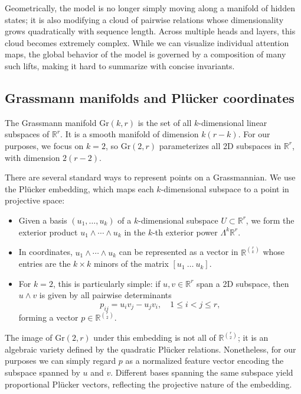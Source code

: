 \documentclass[11pt]{article}
\newcommand{\Gr}{\mathrm{Gr}}
\begin{document}
Geometrically, the model is no longer simply moving along a manifold of hidden states; it is also modifying a cloud of pairwise relations whose dimensionality grows quadratically with sequence length. Across multiple heads and layers, this cloud becomes extremely complex. While we can visualize individual attention maps, the global behavior of the model is governed by a composition of many such lifts, making it hard to summarize with concise invariants.

\subsection{Grassmann manifolds and Pl\"ucker coordinates}

The Grassmann manifold $\Gr(k, r)$ is the set of all $k$-dimensional linear subspaces of $\mathbb{R}^r$. It is a smooth manifold of dimension $k(r - k)$. For our purposes, we focus on $k=2$, so $\Gr(2, r)$ parameterizes all 2D subspaces in $\mathbb{R}^r$, with dimension $2(r-2)$.

There are several standard ways to represent points on a Grassmannian. We use the Pl\"ucker embedding, which maps each $k$-dimensional subspace to a point in projective space:

\begin{itemize}
    \item Given a basis $(u_1, \dots, u_k)$ of a $k$-dimensional subspace $U \subset \mathbb{R}^r$, we form the exterior product $u_1 \wedge \cdots \wedge u_k$ in the $k$-th exterior power $\Lambda^k \mathbb{R}^r$.
    \item In coordinates, $u_1 \wedge \cdots \wedge u_k$ can be represented as a vector in $\mathbb{R}^{\binom{r}{k}}$ whose entries are the $k \times k$ minors of the matrix $[u_1 \ \dots \ u_k]$.
    \item For $k=2$, this is particularly simple: if $u, v \in \mathbb{R}^r$ span a 2D subspace, then $u \wedge v$ is given by all pairwise determinants
    \[
    p_{ij} = u_i v_j - u_j v_i,\quad 1 \le i < j \le r,
    \]
    forming a vector $p \in \mathbb{R}^{\binom{r}{2}}$.
\end{itemize}

The image of $\Gr(2,r)$ under this embedding is not all of $\mathbb{R}^{\binom{r}{2}}$; it is an algebraic variety defined by the quadratic Pl\"ucker relations. Nonetheless, for our purposes we can simply regard $p$ as a normalized feature vector encoding the subspace spanned by $u$ and $v$. Different bases spanning the same subspace yield proportional Pl\"ucker vectors, reflecting the projective nature of the embedding.
\end{document}

